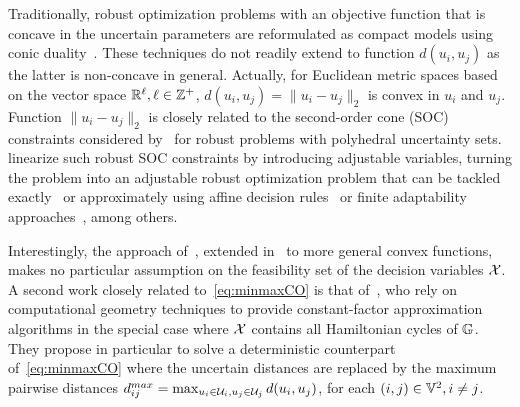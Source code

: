 \documentclass[12pt]{article}
\begin{document}
Traditionally, robust optimization problems with an objective function that is concave in the uncertain parameters are reformulated as compact models using conic duality~\citep{ben1998robust}. These techniques do not readily extend to function $d(u_i,u_j)$ as the latter is non-concave in general. Actually, for Euclidean metric spaces based on the vector space $\mathbb{R}^\ell, \ell\in\mathbb{Z}^+$, $d(u_i,u_j)=\|u_i-u_j\|_2$ is convex in $u_i$ and $u_j$. Function $\|u_i-u_j\|_2$ is closely related to the second-order cone (SOC) constraints considered by~\cite{zhen2021robust} for robust problems with polyhedral uncertainty sets. \cite{zhen2021robust} linearize such robust SOC constraints by introducing adjustable variables, turning the problem into an adjustable robust optimization problem that can be tackled exactly~\citep{AyoubP16,ZhenHS18,zeng2013solving} or approximately using affine decision rules~\citep{Ben-TalGGN04} or finite adaptability approaches~\citep{BertsimasD16,hanasusanto2015k,postek2016multistage,subramanyam2019k}, among others. 

Interestingly, the approach of~\cite{zhen2021robust}, extended in~\cite{roos2018approximation} to more general convex functions, makes no particular assumption on the feasibility set of the decision variables $\mathcal{X}$. A second work closely related to~\ref{eq:minmaxCO} is that of~\cite{citovsky2017tsp}, who rely on computational geometry techniques to provide constant-factor approximation algorithms in the special case where $\mathcal{X}$ contains all Hamiltonian cycles of $\mathbb{G}$. They propose in particular to solve a deterministic counterpart of~\ref{eq:minmaxCO} where the uncertain distances are replaced by the maximum pairwise distances $d^{max}_{ij}=\max_{u_i\in \mathcal{U}_i, u_j\in \mathcal{U}_j} d(u_i,u_j)$, for each $(i,j)\in \mathbb{V}^2, i\neq j$.

\end{document}
